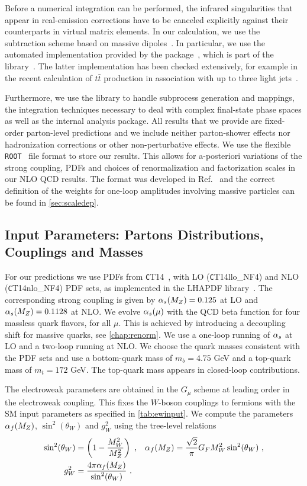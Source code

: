 Before a numerical integration can be performed, the infrared singularities that appear in real-emission corrections have to be canceled explicitly against their counterparts in virtual matrix elements. In our calculation, we
use the subtraction scheme based on massive dipoles~\cite{Catani2002}.
In particular, we use the automated implementation provided by
the \COMIX{} package~\cite{Comix}, which is part of the \SHERPA{}
library~\cite{Sherpa}. The latter implementation has been checked extensively, for example in the recent calculation of $t\bar t$ production in association
with up to three light jets~\cite{ttjjj}. 

Furthermore, we use the \SHERPA{} library to handle subprocess generation and
mappings, the integration techniques necessary to deal with complex final-state
phase spaces as well as the internal analysis package. 
%
All results that we provide are fixed-order parton-level predictions and we include neither parton-shower effects nor hadronization corrections or other
non-perturbative effects.
%
We use the flexible \texttt{ROOT}~\cite{ROOT} \ntuple{} file format to store our results. This allows for a-posteriori variations of the strong coupling,
PDFs and choices of renormalization and factorization
scales in our NLO QCD results. The \ntuple{} format was developed in
Ref.~\cite{BH:Ntuples} and the correct definition of the weights for
one-loop amplitudes involving massive particles can be found in \cref{sec:scaledep}.

\subsection{Input Parameters: Partons Distributions, Couplings and Masses}
\label{sec:base_setup}
For our predictions we use PDFs from {\texttt CT14}~\cite{CT14},
with LO ({\texttt CT14llo\_NF4}) and NLO ({\texttt CT14nlo\_NF4}) PDF sets, as
implemented in the LHAPDF library~\cite{LHAPDF}. The corresponding strong
coupling is given by $\alpha_s(M_Z)=0.125$ at LO and
$\alpha_s(M_Z)=0.1128$ at NLO. We evolve $\alpha_s(\mu)$ with
the QCD beta function for four massless quark flavors, for all $\mu$. This is
achieved by introducing a decoupling shift for massive quarks, see \cref{chap:renorm}. We
use a one-loop running of $\alpha_s$ at LO and a two-loop running at NLO. We
choose the quark masses consistent with the PDF sets and use a bottom-quark mass of $m_b=4.75$ GeV and a top-quark mass of $m_t=172$ GeV. The top-quark
mass appears in closed-loop contributions.


The electroweak parameters are obtained in the $G_\mu$
scheme \cite{Denner2000c} at leading order in the electroweak coupling. This fixes the
$W$-boson couplings to fermions with the SM input
parameters as specified in \cref{tab:ewinput}. We compute the parameters $\alpha_f(M_Z)$,
$\sin^2(\theta_W)$ and $g_W^2$ using the tree-level relations
\begin{align}\label{eq:ewlorel}
\sin^2(\theta_W) &= \left(1-\frac{M_W^2}{M_Z^2}\right)\ , & \alpha_f(M_Z)&=\frac{\sqrt{2}}{\pi}G_F M_W^2
  \sin^2(\theta_W)\ ,\notag\\
g_W^2&=\frac{4\pi\alpha_f(M_Z) }{\sin^2(\theta_W)}\ .
\end{align}

